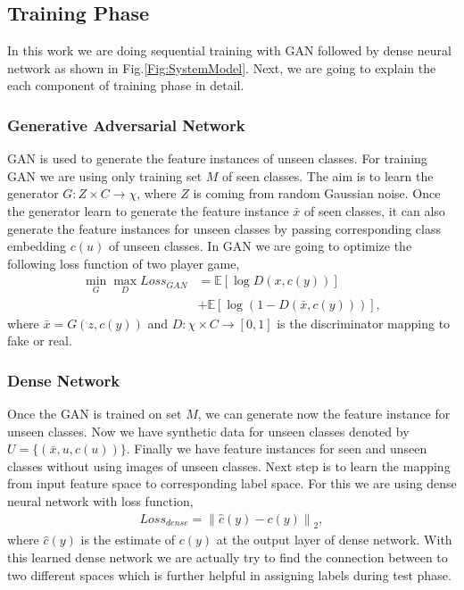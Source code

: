 \documentclass[11pt, conference, english]{IEEEtran}
\theoremstyle{plain}
\theoremstyle{definition}
\theoremstyle{remark}
\newcommand{\eq}[1]{\begin{align*}#1\end{align*}}
\newcommand{\norm}[1]{\left\lVert#1\right\rVert}
\newcommand{\E}{\mathbb{E}}
\begin{document}
	
	\subsection{Training Phase}
	In this work we are doing sequential training with GAN followed by dense neural network as shown in Fig.\ref{Fig:SystemModel}. Next, we are going to explain the each component of training phase in detail.
	\subsubsection{Generative Adversarial Network } GAN is used to generate the feature instances of unseen classes. For training GAN we are using only training set $M$ of seen classes. The aim is to learn the generator $G:Z \times C \rightarrow \chi$, where $Z$ is coming from random Gaussian noise. Once the generator learn to generate the feature instance $\bar{x}$ of seen classes, it can also generate the feature instances for unseen classes by passing corresponding class embedding $c(u)$ of unseen classes. In GAN we are going to optimize the following loss function of two player game,
	\eq{\min_G \max_D Loss_{GAN}&=\E [\log D(x,c(y))]\\
		&+\E[\log(1-D(\bar{x},c(y)))],}
	where $\bar{x}=G(z,c(y))$ and $D:\chi \times C \rightarrow [0,1]$ is the discriminator mapping to fake or real.
	\subsubsection{Dense Network}
	 Once the GAN is trained on set $M$, we can generate now the feature instance for unseen classes. Now we have synthetic data for unseen classes denoted by 
	$U=\{(\bar{x},u,c(u))\}$. Finally we have feature instances for seen and unseen classes without using images of unseen classes. Next step is to learn the mapping from input feature space to corresponding label space. For this we are using dense neural network with loss function,
	\eq{Loss_{dense}=\norm{\hat{c}(y)-c(y)}_2,} 
	where $\hat{c}(y)$ is the estimate of $c(y)$ at the output layer of dense network. With this learned dense network we are actually try to find the connection between to two different spaces which is further helpful in assigning labels during test phase.
	
\end{document}
